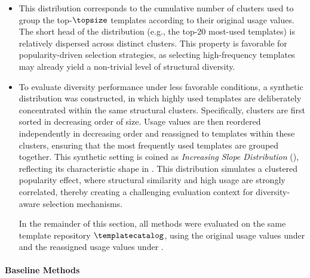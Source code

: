 \begin{itemize}
    \item[\textbf{Original Dataset Distribution (\ODD)}] This distribution corresponds to the cumulative number of clusters used to group the top-$\topsize$ templates according to their original usage values. The short head of the distribution (e.g., the top-20 most-used templates) is relatively dispersed across distinct clusters.
This property is favorable for popularity-driven selection strategies, as selecting high-frequency templates may already yield a non-trivial level of structural diversity.

\item[\textbf{Increasing Slope Distribution (\ISD)}] To evaluate diversity performance under less favorable conditions,  a synthetic distribution was constructed, in which highly used templates are deliberately concentrated within the same structural clusters. Specifically, clusters are first sorted in decreasing order of size. Usage values are then reordered independently in decreasing order and reassigned to templates within these clusters, ensuring that the most frequently used templates are grouped together. This synthetic setting is coined as \emph{Increasing Slope Distribution} (\ISD), reflecting its characteristic shape in . This distribution simulates a clustered popularity effect, where structural similarity and high usage are strongly correlated, thereby creating a challenging evaluation context for diversity-aware selection mechanisms.

In the remainder of this section,  all methods were evaluated on the same template repository $\templatecatalog$, using the original usage values under \ODD and the reassigned usage values under \ISD.
\end{itemize}



\paragraph{Baseline Methods}


